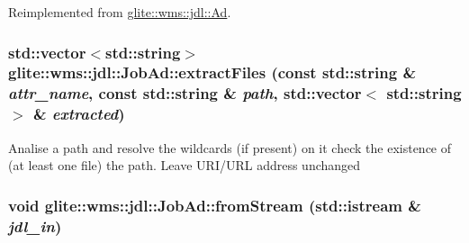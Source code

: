 Reimplemented from \hyperlink{classglite_1_1wms_1_1jdl_1_1Ad_z17_1}{glite::wms::jdl::Ad}.\hypertarget{classglite_1_1wms_1_1jdl_1_1JobAd_b3}{
\subsubsection[extractFiles]{\setlength{\rightskip}{0pt plus 5cm}std::vector$<$std::string$>$ glite::wms::jdl::Job\-Ad::extract\-Files (const std::string \& {\em attr\_\-name}, const std::string \& {\em path}, std::vector$<$ std::string $>$ \& {\em extracted})}}
\label{classglite_1_1wms_1_1jdl_1_1JobAd_b3}


Analise a path and resolve the wildcards (if present) on it check the existence of (at least one file) the path. Leave URI/URL address unchanged \hypertarget{classglite_1_1wms_1_1jdl_1_1JobAd_z3_0}{
\subsubsection[fromStream]{\setlength{\rightskip}{0pt plus 5cm}void glite::wms::jdl::Job\-Ad::from\-Stream (std::istream \& {\em jdl\_\-in})}}
\label{classglite_1_1wms_1_1jdl_1_1JobAd_z3_0}


